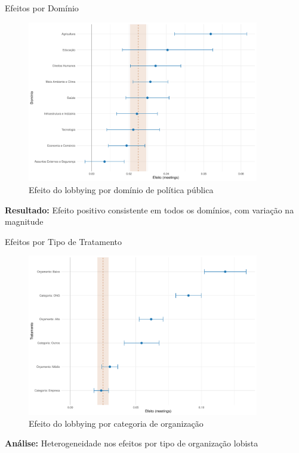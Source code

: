 \documentclass[aspectratio=169]{beamer}
\begin{document}
\begin{frame}{Efeitos por Domínio}
\begin{figure}
\centering
\includegraphics[width=0.9\textwidth]{figures/fig_coeff_domains.pdf}
\caption{Efeito do lobbying por domínio de política pública}
\end{figure}

\textbf{Resultado:} Efeito positivo consistente em todos os domínios, com variação na magnitude
\end{frame}

\begin{frame}{Efeitos por Tipo de Tratamento}
\begin{figure}
\centering
\includegraphics[width=0.9\textwidth]{figures/fig_coeff_treatments_overall.pdf}
\caption{Efeito do lobbying por categoria de organização}
\end{figure}

\textbf{Análise:} Heterogeneidade nos efeitos por tipo de organização lobista
\end{frame}
\end{document}
